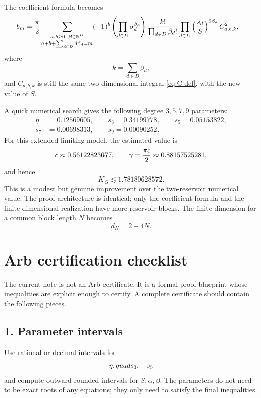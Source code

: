 \documentclass[11pt]{article}
\newcommand{\N}{\mathbb{N}}
\newcommand{\1}{\mathbf{1}}
\begin{document}
The coefficient formula becomes
\begin{align}\label{eq:general-D-coeff}
        b_m={\pi\over2}
        \sum_{\substack{a,b\ge0,\;\boldsymbol\beta\in\N^D\\
        a+b+\sum_{d\in D}d\beta_d=m}}
        &(-1)^b\left(\prod_{d\in D}\sigma_d^{\beta_d}\right)
        {k!\over\prod_{d\in D}\beta_d!}
        \prod_{d\in D}\left({s_d\over S}\right)^{2\beta_d}
        C_{a,b,k}^2,
\end{align}
where
\[
        k=\sum_{d\in D}\beta_d,
\]
and \(C_{a,b,k}\) is still the same two-dimensional integral \eqref{eq:C-def}, with the new value of \(S\).

A quick numerical search gives the following degree \(3,5,7,9\) parameters:
\begin{align*}
        \eta&=0.12569605,\qquad
        s_3=0.34199778,
        \qquad
        s_5=0.05153822,\\
        s_7&=0.00698313,
        \qquad
        s_9=0.00090252.
\end{align*}
For this extended limiting model, the estimated value is
\[
        c\approx0.56122823677,
        \qquad
        \gamma={\pi c\over2}\approx0.88157525281,
\]
and hence
\[
        K_G\lesssim 1.78180628572.
\]
This is a modest but genuine improvement over the two-reservoir numerical value.  The proof architecture is identical; only the coefficient formula and the finite-dimensional realization have more reservoir blocks.  The finite dimension for a common block length \(N\) becomes
\[
        d_N=2+4N.
\]

\section{Arb certification checklist}

The current note is not an Arb certificate.  It is a formal proof blueprint whose inequalities are explicit enough to certify.  A complete certificate should contain the following pieces.

\subsection*{1. Parameter intervals}
Use rational or decimal intervals for
\[
        \eta,\\quad s_3,
        \quad s_5
\]
and compute outward-rounded intervals for \(S,\alpha,\beta\).  The parameters do not need to be exact roots of any equations; they only need to satisfy the final inequalities.
\end{document}
